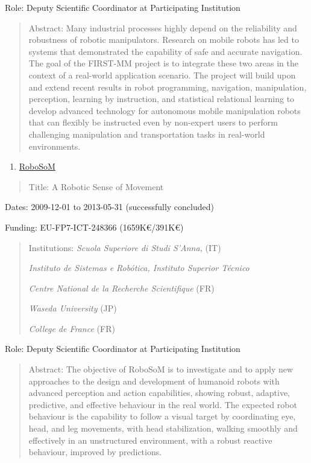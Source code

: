 \documentclass[
]{article}
\begin{document}
Role: Deputy Scientific Coordinator at Participating Institution

\begin{quote}
Abstract: Many industrial processes highly depend on the reliability and
robustness of robotic manipulators. Research on mobile robots has led to
systems that demonstrated the capability of safe and accurate
navigation. The goal of the FIRST-MM project is to integrate these two
areas in the context of a real-world application scenario. The project
will build upon and extend recent results in robot programming,
navigation, manipulation, perception, learning by instruction, and
statistical relational learning to develop advanced technology for
autonomous mobile manipulation robots that can flexibly be instructed
even by non-expert users to perform challenging manipulation and
transportation tasks in real-world environments.
\end{quote}

\begin{enumerate}
\def\labelenumi{\arabic{enumi}.}
\setcounter{enumi}{10}
\item
  \ul{RoboSoM}
\end{enumerate}

\begin{quote}
Title: A Robotic Sense of Movement
\end{quote}

Dates: 2009-12-01 to 2013-05-31 (successfully concluded)

Funding: EU-FP7-ICT-248366 (1659K€/391K€)

\begin{quote}
Institutions: \emph{Scuola Superiore di Studi S'Anna,} (IT)

\emph{Instituto de Sistemas e Robótica, Instituto Superior Técnico}

\emph{Centre National de la Recherche Scientifique} (FR)

\emph{Waseda University} (JP)

\emph{College de France} (FR)
\end{quote}

Role: Deputy Scientific Coordinator at Participating Institution

\begin{quote}
Abstract: The objective of RoboSoM is to investigate and to apply new
approaches to the design and development of humanoid robots with
advanced perception and action capabilities, showing robust, adaptive,
predictive, and effective behaviour in the real world. The expected
robot behaviour is the capability to follow a visual target by
coordinating eye, head, and leg movements, with head stabilization,
walking smoothly and effectively in an unstructured environment, with a
robust reactive behaviour, improved by predictions.
\end{quote}
\end{document}
